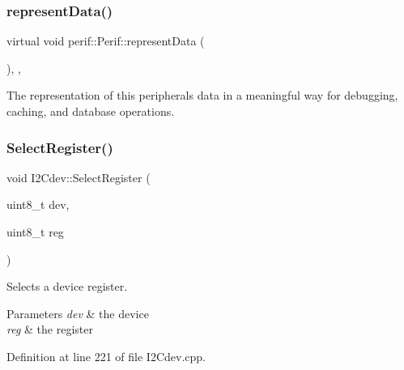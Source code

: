 \subsubsection{\texorpdfstring{representData()}{representData()}}
{\footnotesize\ttfamily virtual void perif\+::\+Perif\+::represent\+Data (\begin{DoxyParamCaption}{ }\end{DoxyParamCaption})\hspace{0.3cm}{\ttfamily [protected]}, {}, {\ttfamily [inherited]}}

The representation of this peripheral\textquotesingle{}s data in a meaningful way for debugging, caching, and database operations. \mbox{\label{classI2Cdev_a3be31bf7d3f40bb215d8854aac945db3}} 
\subsubsection{\texorpdfstring{SelectRegister()}{SelectRegister()}}
{\footnotesize\ttfamily void I2\+Cdev\+::\+Select\+Register (\begin{DoxyParamCaption}\item[{uint8\+\_\+t}]{dev,  }\item[{uint8\+\_\+t}]{reg }\end{DoxyParamCaption})\hspace{0.3cm}{\ttfamily [inherited]}}

Selects a device register.


\begin{DoxyParams}{Parameters}
{\em dev} & the device \\
\hline
{\em reg} & the register \\
\hline
\end{DoxyParams}


Definition at line 221 of file I2\+Cdev.\+cpp.


